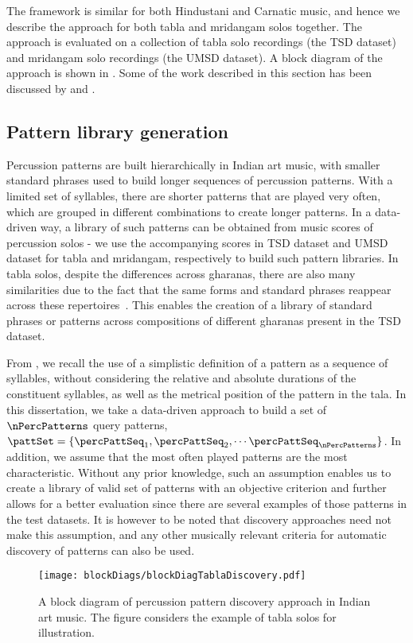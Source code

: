 The framework is similar for both Hindustani and Carnatic music, and hence we describe the approach for both \gls{tabla} and mridangam solos together. The approach is evaluated on a collection of \gls{tabla} solo recordings (the \acrshort{TSD} dataset) and mridangam solo recordings (the \acrshort{UMSD} dataset). A block diagram of the approach is shown in . Some of the work described in this section has been discussed by  and . 
%
\subsection{Pattern library generation}
Percussion patterns are built hierarchically in Indian art music, with smaller standard phrases used to build longer sequences of percussion patterns. With a limited set of syllables, there are shorter patterns that are played very often, which are grouped in different combinations to create longer patterns. In a data-driven way, a library of such patterns can be obtained from music scores of percussion solos - we use the accompanying scores in \acrshort{TSD} dataset and \acrshort{UMSD} dataset for \gls{tabla} and mridangam, respectively to build such pattern libraries. In \gls{tabla} solos, despite the differences across \glspl{gharana}, there are also many similarities due to the fact that the same forms and standard phrases reappear across these repertoires~\cite[p.~52]{gottlieb:93:tabla}. This enables the creation of a library of standard phrases or patterns across compositions of different \glspl{gharana} present in the \acrshort{TSD} dataset. 

From , we recall the use of a simplistic definition of a pattern as a sequence of syllables, without considering the relative and absolute durations of the constituent syllables, as well as the metrical position of the pattern in the \gls{tala}. In this dissertation, we take a data-driven approach to build a set of $\nPercPatterns$ query patterns, $\pattSet = \{\percPattSeq_1, \percPattSeq_2, \cdots \percPattSeq_\nPercPatterns\}$. In addition, we assume that the most often played patterns are the most characteristic. Without any prior knowledge, such an assumption enables us to create a library of valid set of patterns with an objective criterion and further allows for a better evaluation since there are several examples of those patterns in the test datasets. It is however to be noted that discovery approaches need not make this assumption, and any other musically relevant criteria for automatic discovery of patterns can also be used. 
\begin{figure}
\centering
\texttt{[image: blockDiags/blockDiagTablaDiscovery.pdf]}
\caption[Block diagram: Percussion pattern discovery in Indian art music]{A block diagram of percussion pattern discovery approach in Indian art music. The figure considers the example of \gls{tabla} solos for illustration.}
\label{fig:BD:tablaPattDiscovery}
\end{figure}

